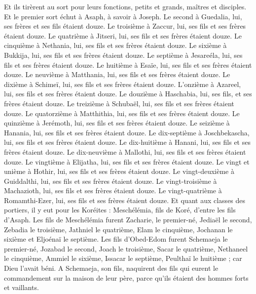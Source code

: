 \begin{multicols}{2}
Et ils tirèrent au sort pour leurs fonctions, petits et grands, maîtres et disciples.
Et le premier sort échut à Asaph, à savoir à Joseph. Le second à Guedalia, lui, ses frères et ses fils étaient douze.
Le troisième à Zaccur, lui, ses fils et ses frères étaient douze.
Le quatrième à Jitseri, lui, ses fils et ses frères étaient douze.
Le cinquième à Nethania, lui, ses fils et ses frères étaient douze.
Le sixième à Bukkija, lui, ses fils et ses frères étaient douze.
Le septième à Jesareéla, lui, ses fils et ses frères étaient douze.
Le huitième à Esaïe, lui, ses fils et ses frères étaient douze.
Le neuvième à Matthania, lui, ses fils et ses frères étaient douze.
Le dixième à Schimeï, lui, ses fils et ses frères étaient douze.
L'onzième à Azareel, lui, ses fils et ses frères étaient douze.
Le douzième à Haschabia, lui, ses fils, et ses frères étaient douze.
Le treizième à Schubaël, lui, ses fils et ses frères étaient douze.
Le quatorzième à Matthithia, lui, ses fils et ses frères étaient douze.
Le quinzième à Jerémoth, lui, ses fils et ses frères étaient douze.
Le seizième à Hanania, lui, ses fils et ses frères étaient douze.
Le dix-septième à Joschbekascha, lui, ses fils et ses frères étaient douze.
Le dix-huitième à Hanani, lui, ses fils et ses frères étaient douze.
Le dix-neuvième à Mallothi, lui, ses fils et ses frères étaient douze.
Le vingtième à Elijatha, lui, ses fils et ses frères étaient douze.
Le vingt et unième à Hothir, lui, ses fils et ses frères étaient douze.
Le vingt-deuxième à Guiddalthi, lui, ses fils et ses frères étaient douze.
Le vingt-troisième à Machazioth, lui, ses fils et ses frères étaient douze.
Le vingt-quatrième à Romamthi-Ezer, lui, ses fils et ses frères étaient douze.
\VerseOne{}Et quant aux classes des portiers, il y eut pour les Koréites : Meschélémia, fils de Koré, d'entre les fils d'Asaph.
Les fils de Meschélémia furent Zacharie, le premier-né, Jediaël le second, Zebadia le troisième, Jathniel le quatrième,
Elam le cinquième, Jochanan le sixième et Eljoénaï le septième.
Les fils d'Obed-Edom furent Schemaeja le premier-né, Jozabad le second, Joach le troisième, Sacar le quatrième, Nethaneel le cinquième,
Ammiel le sixième, Issacar le septième, Peulthaï le huitième ; car Dieu l'avait béni.
A Schemaeja, son fils, naquirent des fils qui eurent le commandement sur la maison de leur père, parce qu'ils étaient des hommes forts et vaillants.

\end{multicols}
